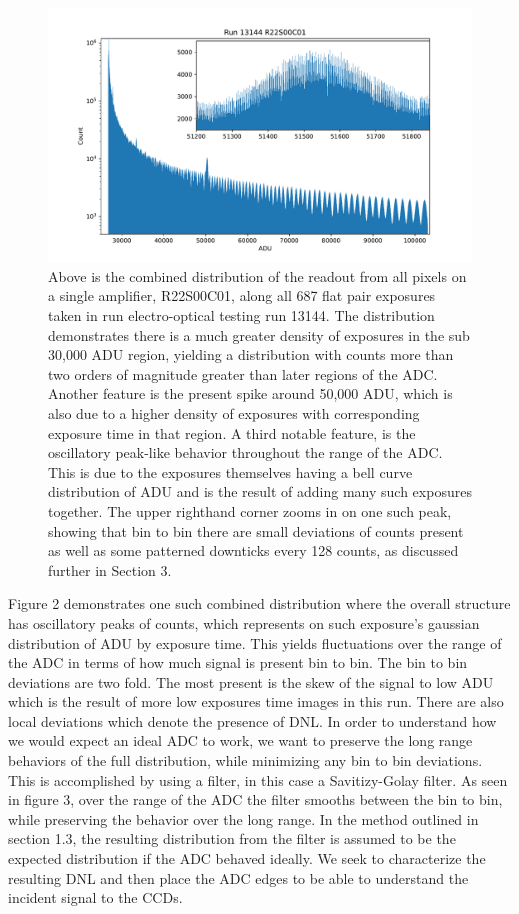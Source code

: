 \documentclass[11pt, letterpaper]{article}
\begin{document}
\begin{figure}
    \centering
    \includegraphics[width=0.5\linewidth]{bar1.pdf}
    \caption{Above is the combined distribution of the readout from all pixels on a single amplifier, R22S00C01, along all 687 flat pair exposures taken in run electro-optical testing run 13144. The distribution demonstrates there is a much greater density of exposures in the sub 30,000 ADU region, yielding a distribution with counts more than two orders of magnitude greater than later regions of the ADC. Another feature is the present spike around 50,000 ADU, which is also due to a higher density of exposures with corresponding exposure time in that region. A third notable feature, is the oscillatory peak-like behavior throughout the range of the ADC. This is due to the exposures themselves having a bell curve distribution of ADU and is the result of adding many such exposures together. The upper righthand corner zooms in on one such peak, showing that bin to bin there are small deviations of counts present as well as some patterned downticks every 128 counts, as discussed further in Section 3.}
    \label{fig:enter-label}
\end{figure}

Figure 2 demonstrates one such combined distribution where the overall structure has oscillatory peaks of counts, which represents on such exposure's gaussian distribution of ADU by exposure time. 
This yields fluctuations over the range of the ADC in terms of how much signal is present bin to bin. 
The bin to bin deviations are two fold. 
The most present is the skew of the signal to low ADU which is the result of more low exposures time images in this run. 
There are also local deviations which denote the presence of DNL. 
In order to understand how we would expect an ideal ADC to work, we want to preserve the long range behaviors of the full distribution, while minimizing any bin to bin deviations. 
This is accomplished by using a filter, in this case a Savitizy-Golay filter. 
As seen in figure 3, over the range of the ADC the filter smooths between the bin to bin, while preserving the behavior over the long range. 
In the method outlined in section 1.3, the resulting distribution from the filter is assumed to be the expected distribution if the ADC behaved ideally. 
We seek to characterize the resulting DNL and then place the ADC edges to be able to understand the incident signal to the CCDs. 
\end{document}
